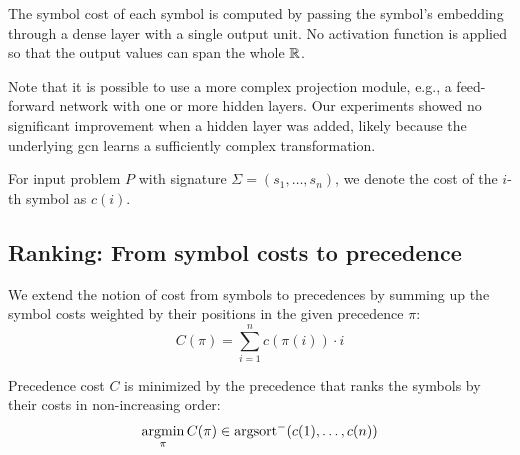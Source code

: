 The symbol cost of each symbol is computed by passing the symbol's embedding through a dense layer with a single output unit.
No activation function is applied so that the output values can span the whole $\operatorname{\mathbb{R}}$.

Note that it is possible to use a more complex projection module,
e.g., a feed-forward network with one or more hidden layers.
Our experiments showed no significant improvement when a hidden layer was added,
likely because the underlying \gls{gcn} learns a sufficiently complex transformation.

For input problem $P$
with signature $\Sigma = (s_1, \ldots, s_n)$,
we denote the cost of the $i$-th symbol as $c(i)$.

\subsection{Ranking: From symbol costs to precedence}
\label{sec:ranking}


We extend the notion of cost from symbols to precedences
by summing up the symbol costs
weighted by their positions in the given precedence $\pi$:
$$
C(\pi) = \sum_{i=1}^n c(\pi(i)) \cdot i
$$

\begin{lemma}
Precedence cost $C$ is minimized by the precedence that ranks the symbols by their costs in non-increasing order:
$$
\operatorname*{argmin}_\pi C(\pi) \in \operatorname{argsort}^- (c(1), \ldots, c(n))
$$
\end{lemma}

